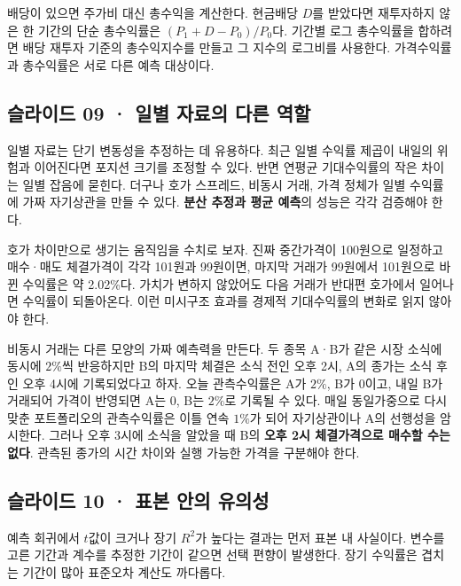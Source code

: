 \documentclass[11pt,a4paper]{article}
\begin{document}
배당이 있으면 주가비 대신 총수익을 계산한다. 현금배당 $D$를 받았다면 재투자하지 않은 한 기간의 단순 총수익률은 $(P_1+D-P_0)/P_0$다. 기간별 로그 총수익률을 합하려면 배당 재투자 기준의 총수익지수를 만들고 그 지수의 로그비를 사용한다. 가격수익률과 총수익률은 서로 다른 예측 대상이다.\par

\subsection{슬라이드 09 · 일별 자료의 다른 역할}
일별 자료는 단기 변동성을 추정하는 데 유용하다. 최근 일별 수익률 제곱이 내일의 위험과 이어진다면 포지션 크기를 조정할 수 있다. 반면 연평균 기대수익률의 작은 차이는 일별 잡음에 묻힌다. 더구나 호가 스프레드, 비동시 거래, 가격 정체가 일별 수익률에 가짜 자기상관을 만들 수 있다. \textbf{분산 추정과 평균 예측}의 성능은 각각 검증해야 한다.\par

호가 차이만으로 생기는 움직임을 수치로 보자. 진짜 중간가격이 100원으로 일정하고 매수·매도 체결가격이 각각 101원과 99원이면, 마지막 거래가 99원에서 101원으로 바뀐 수익률은 약 2.02\%다. 가치가 변하지 않았어도 다음 거래가 반대편 호가에서 일어나면 수익률이 되돌아온다. 이런 미시구조 효과를 경제적 기대수익률의 변화로 읽지 않아야 한다.\par

비동시 거래는 다른 모양의 가짜 예측력을 만든다. 두 종목 A·B가 같은 시장 소식에 동시에 $2\%$씩 반응하지만 B의 마지막 체결은 소식 전인 오후 2시, A의 종가는 소식 후인 오후 4시에 기록되었다고 하자. 오늘 관측수익률은 A가 $2\%$, B가 0이고, 내일 B가 거래되어 가격이 반영되면 A는 0, B는 $2\%$로 기록될 수 있다. 매일 동일가중으로 다시 맞춘 포트폴리오의 관측수익률은 이틀 연속 $1\%$가 되어 자기상관이나 A의 선행성을 암시한다. 그러나 오후 3시에 소식을 알았을 때 B의 \textbf{오후 2시 체결가격으로 매수할 수는 없다}. 관측된 종가의 시간 차이와 실행 가능한 가격을 구분해야 한다.\par

\subsection{슬라이드 10 · 표본 안의 유의성}
예측 회귀에서 $t$값이 크거나 장기 $R^2$가 높다는 결과는 먼저 표본 내 사실이다. 변수를 고른 기간과 계수를 추정한 기간이 같으면 선택 편향이 발생한다. 장기 수익률은 겹치는 기간이 많아 표준오차 계산도 까다롭다.\par
\end{document}
